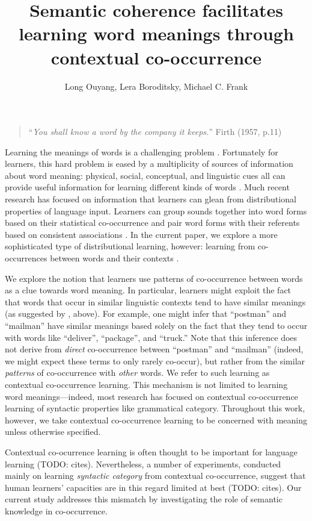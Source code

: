 \documentclass[man,floatsintext]{apa6}
\title{Semantic coherence facilitates learning word meanings through contextual co-occurrence}
\author{Long Ouyang, Lera Boroditsky, Michael C. Frank}
\affiliation{Department of Psychology, Stanford University}
\begin{document}
\maketitle

\begin{quote}
``\emph{You shall know a word by the company it keeps.}'' Firth (1957, p.11)
\end{quote}


Learning the meanings of words is a challenging problem \citep{quine1960,carey1978}. Fortunately for learners, this hard problem is eased by a multiplicity of sources of information about word meaning: physical, social, conceptual, and linguistic cues all can provide useful information for learning different kinds of words \citep{clark1988,markman1991,gleitman1990,baldwin1993,hollich2000}. Much recent research has focused on information that learners can glean from distributional properties of language input. Learners can group sounds together into word forms based on their statistical co-occurrence \citep{saffran1996a, saffran1996b} and pair word forms with their referents based on consistent associations \citep{yu2007,smith2008}. In the current paper, we explore a more sophisticated type of distributional learning, however: learning from co-occurrences between words and their contexts \citep{smith1966, maratsos1980,braine1987,redington1998}.

We explore the notion that learners use patterns of co-occurrence between words as a clue towards word meaning. In particular, learners might exploit the fact that words that occur in similar linguistic contexts tend to have similar meanings (as suggested by \citealp{firth1957}, above). For example, one might infer that ``postman'' and ``mailman'' have similar meanings based solely on the fact that they tend to occur with words like ``deliver'', ``package'', and ``truck.'' Note that this inference does not derive from \emph{direct} co-occurrence between ``postman'' and ``mailman'' (indeed, we might expect these terms to only rarely co-occur), but rather from the similar \emph{patterns} of co-occurrence with \emph{other} words. We refer to such learning as contextual co-occurrence learning. This mechanism is not limited to learning word meanings---indeed, most research has focused on contextual co-occurrence learning of syntactic properties like grammatical category. Throughout this work, however, we take contextual co-occurrence learning to be concerned with meaning unless otherwise specified.

Contextual co-ocurrence learning is often thought to be important for language learning (TODO: cites). Nevertheless, a number of experiments, conducted mainly on learning \emph{syntactic category} from contextual co-occurrence, suggest that human learners' capacities are in this regard limited at best (TODO: cites). Our current study addresses this mismatch by investigating the role of semantic knowledge in co-occurrence.
 
\end{document}
